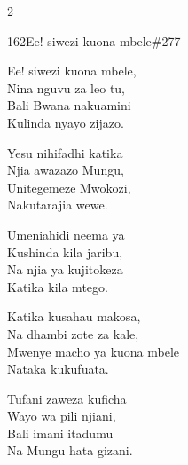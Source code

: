 \begin{multicols}{2}
\begin{hymn}{162}{Ee! siwezi kuona mbele}{\#277}
\begin{stanza}
Ee! siwezi kuona mbele,\\
Nina nguvu za leo tu,\\
Bali Bwana nakuamini\\
Kulinda nyayo zijazo.
\end{stanza}
\begin{chorus}
Yesu nihifadhi katika\\
Njia awazazo Mungu,\\
Unitegemeze Mwokozi,\\
Nakutarajia wewe.
\end{chorus}
\begin{stanza}
Umeniahidi neema ya\\
Kushinda kila jaribu,\\
Na njia ya kujitokeza\\
Katika kila mtego.
\end{stanza}
\begin{stanza}
Katika kusahau makosa,\\
Na dhambi zote za kale,\\
Mwenye macho ya kuona mbele\\
Nataka kukufuata.
\end{stanza}
\begin{stanza}
Tufani zaweza kuficha\\
Wayo wa pili njiani,\\
Bali imani itadumu\\
Na Mungu hata gizani.
\end{stanza}
\end{hymn}


\end{multicols}
